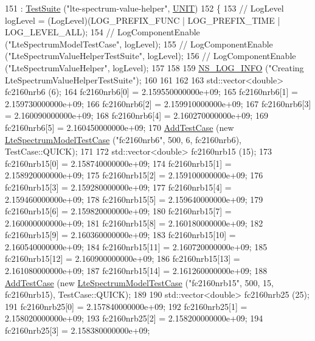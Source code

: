 \begin{DoxyCode}
151   : \hyperlink{classns3_1_1TestSuite_a904b0c40583b744d30908aeb94636d1a}{TestSuite} (\textcolor{stringliteral}{"lte-spectrum-value-helper"}, \hyperlink{classns3_1_1TestSuite_a1ebfcab34ec8161e085e8e3a1855eae0a3885375a3787abf60431f8454b3cadbd}{UNIT})
152 \{
153 \textcolor{comment}{//   LogLevel logLevel = (LogLevel)(LOG\_PREFIX\_FUNC | LOG\_PREFIX\_TIME | LOG\_LEVEL\_ALL);}
154 \textcolor{comment}{//   LogComponentEnable ("LteSpectrumModelTestCase", logLevel);}
155 \textcolor{comment}{//   LogComponentEnable ("LteSpectrumValueHelperTestSuite", logLevel);}
156 \textcolor{comment}{//   LogComponentEnable ("LteSpectrumValueHelper", logLevel);}
157 
158  
159   \hyperlink{group__logging_gafbd73ee2cf9f26b319f49086d8e860fb}{NS\_LOG\_INFO} (\textcolor{stringliteral}{"Creating LteSpectrumValueHelperTestSuite"});
160 
161 
162 
163   std::vector<double> fc2160nrb6 (6);
164   fc2160nrb6[0] = 2.159550000000e+09;
165   fc2160nrb6[1] = 2.159730000000e+09;
166   fc2160nrb6[2] = 2.159910000000e+09;
167   fc2160nrb6[3] = 2.160090000000e+09;
168   fc2160nrb6[4] = 2.160270000000e+09;
169   fc2160nrb6[5] = 2.160450000000e+09;
170   \hyperlink{classns3_1_1TestCase_a3718088e3eefd5d6454569d2e0ddd835}{AddTestCase} (\textcolor{keyword}{new} \hyperlink{classLteSpectrumModelTestCase}{LteSpectrumModelTestCase} (\textcolor{stringliteral}{"fc2160nrb6"}, 500, 6, 
      fc2160nrb6), TestCase::QUICK);
171 
172   std::vector<double> fc2160nrb15 (15);
173   fc2160nrb15[0] = 2.158740000000e+09;
174   fc2160nrb15[1] = 2.158920000000e+09;
175   fc2160nrb15[2] = 2.159100000000e+09;
176   fc2160nrb15[3] = 2.159280000000e+09;
177   fc2160nrb15[4] = 2.159460000000e+09;
178   fc2160nrb15[5] = 2.159640000000e+09;
179   fc2160nrb15[6] = 2.159820000000e+09;
180   fc2160nrb15[7] = 2.160000000000e+09;
181   fc2160nrb15[8] = 2.160180000000e+09;
182   fc2160nrb15[9] = 2.160360000000e+09;
183   fc2160nrb15[10] = 2.160540000000e+09;
184   fc2160nrb15[11] = 2.160720000000e+09;
185   fc2160nrb15[12] = 2.160900000000e+09;
186   fc2160nrb15[13] = 2.161080000000e+09;
187   fc2160nrb15[14] = 2.161260000000e+09;
188   \hyperlink{classns3_1_1TestCase_a3718088e3eefd5d6454569d2e0ddd835}{AddTestCase} (\textcolor{keyword}{new} \hyperlink{classLteSpectrumModelTestCase}{LteSpectrumModelTestCase} (\textcolor{stringliteral}{"fc2160nrb15"}, 500, 15, 
      fc2160nrb15), TestCase::QUICK);
189 
190   std::vector<double> fc2160nrb25 (25);
191   fc2160nrb25[0] = 2.157840000000e+09;
192   fc2160nrb25[1] = 2.158020000000e+09;
193   fc2160nrb25[2] = 2.158200000000e+09;
194   fc2160nrb25[3] = 2.158380000000e+09;

\end{DoxyCode}
